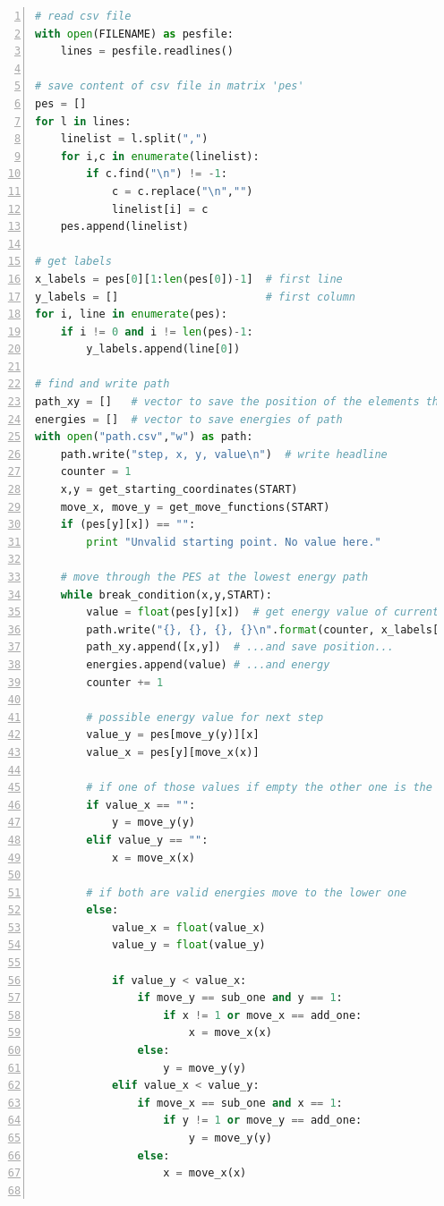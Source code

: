 \documentclass[a4paper,11pt]{scrartcl}
\begin{document}
\begin{lstlisting}[frame=single,language=python,basicstyle=\footnotesize,commentstyle=\color{red},keywordstyle=\color{blue},stringstyle=\color{mygreen},numbers=left]
# read csv file
with open(FILENAME) as pesfile:
    lines = pesfile.readlines()

# save content of csv file in matrix 'pes'
pes = []
for l in lines:
    linelist = l.split(",")
    for i,c in enumerate(linelist):
        if c.find("\n") != -1:
            c = c.replace("\n","")
            linelist[i] = c
    pes.append(linelist)

# get labels
x_labels = pes[0][1:len(pes[0])-1]  # first line
y_labels = []                       # first column
for i, line in enumerate(pes):
    if i != 0 and i != len(pes)-1:
        y_labels.append(line[0])

# find and write path
path_xy = []   # vector to save the position of the elements that make up the path
energies = []  # vector to save energies of path
with open("path.csv","w") as path:
    path.write("step, x, y, value\n")  # write headline
    counter = 1
    x,y = get_starting_coordinates(START)
    move_x, move_y = get_move_functions(START)
    if (pes[y][x]) == "":
        print "Unvalid starting point. No value here."
    
    # move through the PES at the lowest energy path
    while break_condition(x,y,START): 
        value = float(pes[y][x])  # get energy value of current point...
        path.write("{}, {}, {}, {}\n".format(counter, x_labels[x-1], y_labels[y-1], value)) 
        path_xy.append([x,y])  # ...and save position...
        energies.append(value) # ...and energy
        counter += 1
    
        # possible energy value for next step
        value_y = pes[move_y(y)][x]  
        value_x = pes[y][move_x(x)]   

        # if one of those values if empty the other one is the right one
        if value_x == "":
            y = move_y(y)
        elif value_y == "":
            x = move_x(x)

        # if both are valid energies move to the lower one  
        else:
            value_x = float(value_x)
            value_y = float(value_y)

            if value_y < value_x:
                if move_y == sub_one and y == 1:
                    if x != 1 or move_x == add_one:
                        x = move_x(x)
                else:
                    y = move_y(y)
            elif value_x < value_y:
                if move_x == sub_one and x == 1:
                    if y != 1 or move_y == add_one:
                        y = move_y(y)
                else:
                    x = move_x(x)
                    

\end{lstlisting}
\end{document}
